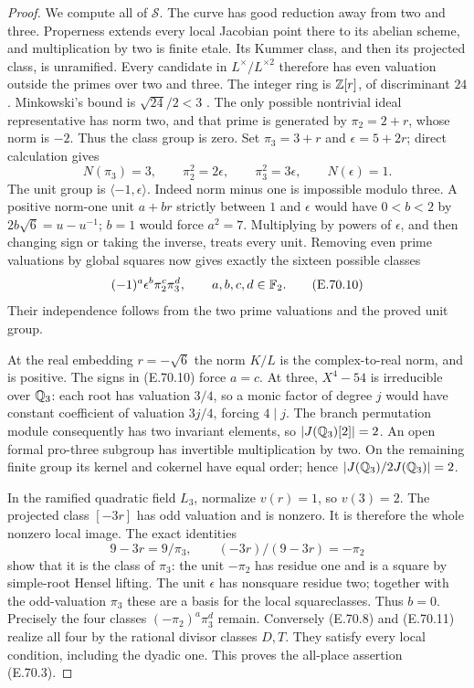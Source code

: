 \begin{proof}
We compute all of $\mathcal S$. The curve has good reduction
away from two and three. Properness extends every local Jacobian
point there to its abelian scheme, and multiplication by two is
finite etale. Its Kummer class, and then its projected class, is
unramified. Every candidate in $L^\times/L^{\times2}$ therefore
has even valuation outside the primes over two and three.
The integer ring is $\mathbb Z[r]$, of discriminant $24$.
Minkowski's bound is $\sqrt{24}/2<3$
\cite[Theorem~4.3, p.~70]{CohMilneANT}. The only possible
nontrivial ideal representative has norm two, and that prime is
generated by $\pi_2=2+r$, whose norm is $-2$. Thus the class
group is zero. Set $\pi_3=3+r$ and $\epsilon=5+2r$; direct
calculation gives
\[
 N(\pi_3)=3,\qquad \pi_2^2=2\epsilon,\qquad
 \pi_3^2=3\epsilon,\qquad N(\epsilon)=1.
 \tag{E.70.9}
\]
The unit group is $\langle-1,\epsilon\rangle$. Indeed norm
minus one is impossible modulo three. A positive norm-one unit
$a+br$ strictly between $1$ and $\epsilon$ would have
$0<b<2$ by $2b\sqrt6=u-u^{-1}$; $b=1$ would force
$a^2=7$. Multiplying by powers of $\epsilon$, and then changing
sign or taking the inverse, treats every unit.
Removing even prime valuations by global squares now gives
exactly the sixteen possible classes
\[
             (-1)^a\epsilon^b\pi_2^c\pi_3^d,
             \qquad a,b,c,d\in\mathbb F_2.
 \tag{E.70.10}
\]
Their independence follows from the two prime valuations and
the proved unit group.

At the real embedding $r=-\sqrt6$ the norm $K/L$ is the
complex-to-real norm, and is positive. The signs in (E.70.10)
force $a=c$. At three, $X^4-54$ is irreducible over $\mathbb Q_3$:
each root has valuation $3/4$, so a monic factor of degree $j$
would have constant coefficient of valuation $3j/4$, forcing
$4\mid j$. The branch permutation module consequently has
two invariant elements, so $|J(\mathbb Q_3)[2]|=2$.
An open formal pro-three subgroup has invertible multiplication
by two. On the remaining finite group its kernel and cokernel
have equal order; hence $|J(\mathbb Q_3)/2J(\mathbb Q_3)|=2$.

In the ramified quadratic field $L_3$, normalize $v(r)=1$,
so $v(3)=2$. The projected class $[-3r]$ has odd valuation
and is nonzero. It is therefore the whole nonzero local image.
The exact identities
\[
 9-3r=9/\pi_3,\qquad (-3r)/(9-3r)=-\pi_2
 \tag{E.70.11}
\]
show that it is the class of $\pi_3$: the unit $-\pi_2$
has residue one and is a square by simple-root Hensel lifting.
The unit $\epsilon$ has nonsquare residue two; together with
the odd-valuation $\pi_3$ these are a basis for the local
squareclasses. Thus $b=0$. Precisely the four classes
$(-\pi_2)^a\pi_3^d$ remain. Conversely (E.70.8) and
(E.70.11) realize all four by the rational divisor classes
$D,T$. They satisfy every local condition, including the
dyadic one. This proves the all-place assertion (E.70.3).


\end{proof}
